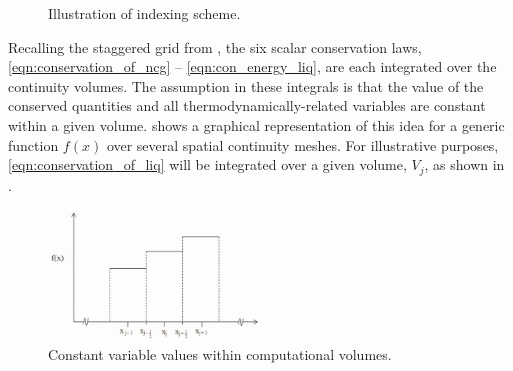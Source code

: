 \begin{figure}[ht]
\begin{center}
\end{center}
\caption{Illustration of indexing scheme.}
\label{fig:vertical_pipe_with_cells}
\end{figure}

Recalling the staggered grid from , the six scalar conservation laws, \eqref{eqn:conservation_of_ncg} -- \eqref{eqn:con_energy_liq}, are each integrated over the continuity volumes.
The assumption in these integrals is that the value of the conserved quantities and all thermodynamically-related variables are constant within a given volume.
 shows a graphical representation of this idea for a generic function $f(x)$ over several spatial continuity meshes. For illustrative purposes, \eqref{eqn:conservation_of_liq} will be integrated over a given volume, $V_j$, as shown in .


\begin{figure}[ht]
\begin{center}
\includegraphics[width=0.5\textwidth]{images/constant_value.eps}
\end{center}
\caption{Constant variable values within computational volumes.}
\label{fig:constant_value}
\end{figure}



